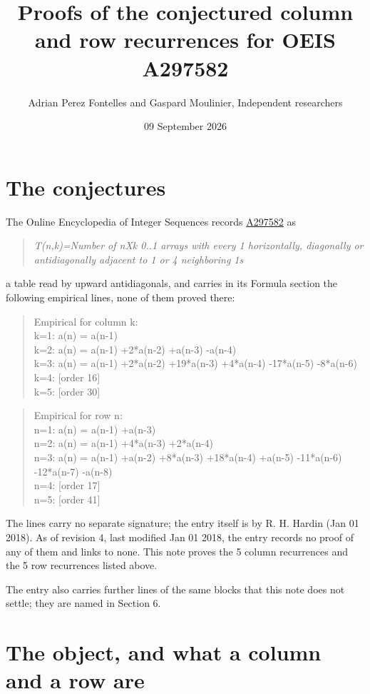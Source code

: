 \documentclass[11pt]{article}
\title{Proofs of the conjectured column and row recurrences for OEIS A297582}
\author{Adrian Perez Fontelles and Gaspard Moulinier, Independent researchers}
\date{09 September 2026}
\theoremstyle{definition}
\begin{document}
\maketitle
\section{The conjectures}

The Online Encyclopedia of Integer Sequences records \href{https://oeis.org/A297582}{A297582} as

\begin{quote}\itshape T(n,k)=Number of nXk 0..1 arrays with every 1 horizontally, diagonally or antidiagonally adjacent to 1 or 4 neighboring 1s\end{quote}

a table read by upward antidiagonals, and carries in its Formula section the following empirical lines, none of them proved there:

\begin{quote}\ttfamily Empirical for column k:\\
k=1: a(n) = a(n-1)\\k=2: a(n) = a(n-1) +2*a(n-2) +a(n-3) -a(n-4)\\k=3: a(n) = a(n-1) +2*a(n-2) +19*a(n-3) +4*a(n-4) -17*a(n-5) -8*a(n-6)\\k=4: [order 16]\\k=5: [order 30]\end{quote}

\begin{quote}\ttfamily Empirical for row n:\\
n=1: a(n) = a(n-1) +a(n-3)\\n=2: a(n) = a(n-1) +4*a(n-3) +2*a(n-4)\\n=3: a(n) = a(n-1) +a(n-2) +8*a(n-3) +18*a(n-4) +a(n-5) -11*a(n-6) -12*a(n-7) -a(n-8)\\n=4: [order 17]\\n=5: [order 41]\end{quote}

The lines carry no separate signature; the entry itself is by R. H. Hardin (Jan 01 2018). As of revision 4, last modified Jan 01 2018, the entry records no proof of any of them and links to none. This note proves the 5 column recurrences and the 5 row recurrences listed above.

The entry also carries further lines of the same blocks that this note does not settle; they are named in Section 6.

\section{The object, and what a column and a row are}
\end{document}
